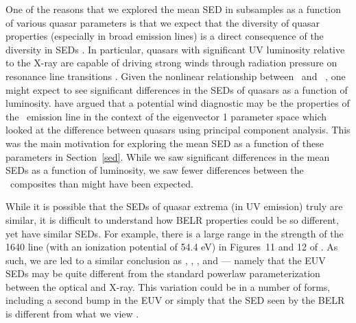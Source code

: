 One of the reasons that we explored the mean SED in subsamples as a function of various quasar parameters is that we expect that the diversity of quasar properties (especially in broad emission lines) is a direct consequence of the diversity in SEDs \citep[e.g.,][]{Richards:2011}.  In particular, quasars with significant UV luminosity relative to the X-ray are capable of driving strong winds through radiation pressure on resonance line transitions \citep{Murray:1995,Proga:2000}.  Given the nonlinear relationship between \luv\ and \lx\ \citep[e.g.,][]{Steffen:2006},
one might expect to see significant differences in the SEDs of quasars as a function of luminosity.  \citet{Richards:2011} have argued that a potential wind diagnostic may be the properties of the \civ\ emission line in the context of the \citet{Boroson:1992} eigenvector 1 parameter space which looked at the difference between quasars using principal component analysis.  This was the main motivation for exploring the mean SED as a function of these parameters in Section~\ref{sed}.  While we saw significant differences in the mean SEDs as a function of luminosity, we saw fewer differences between the \civ\ composites than might have been expected.

While it is possible that the SEDs of quasar extrema (in UV emission) truly are similar, it is difficult to understand how BELR properties could be so different, yet have similar SEDs.  For example, there is a large range in the strength of the  1640 line (with an ionization potential of 54.4 eV) in Figures~11 and 12 of \citet{Richards:2011}.  As such, we are led to a similar conclusion as \citet{Netzer:1979}, \citet{Korista:1997}, \citet{Done:2012}, and \citet{Lawrence:2012}--- namely that the EUV SEDs may be quite different from the standard powerlaw parameterization between the optical and X-ray.  This variation could be in a number of forms, including a second bump in the EUV or simply that the SED seen by the BELR is different from what we view \citep[e.g.,][]{Korista:1997}.

